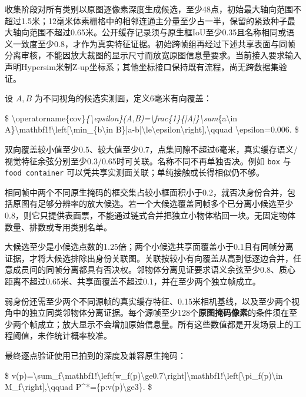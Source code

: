 \documentclass[UTF8,fontset=fandol]{ctexart}
\begin{document}
收集阶段对所有类别以原图逐像素深度生成候选，至少48点，初始最大轴向范围不超过1.5米；12毫米体素栅格中的相邻连通主分量至少占一半，保留的紧致种子最大轴向范围不超过0.65米。公开缓存记录须与原生框IoU至少0.35且名称相同或语义一致度至少0.8，才作为真实特征证据。初始跨帧组再经过下述共享表面与同帧分离审核，不能因放大裁图的显示尺寸而放宽原图信息量要求。当前接入要求输入声明Hypersim米制Z-up坐标系；其他坐标接口保持既有流程，尚无跨数据集验证。



设 $A,B$ 为不同视角的候选实测面，定义6毫米有向覆盖：



\$
\textbackslash{}operatorname\{cov\}\emph{\{\textbackslash{}epsilon\}(A,B)=\textbackslash{}frac\{1\}\{|A|\}\textbackslash{}sum}\{a\textbackslash{}in A\}\textbackslash{}mathbf1!\textbackslash{}left[\textbackslash{}min\_\{b\textbackslash{}in B\}|a-b|\textbackslash{}le\textbackslash{}epsilon\textbackslash{}right],\textbackslash{}qquad \textbackslash{}epsilon=0.006.
\$



双向覆盖较小值至少0.5、较大值至少0.7，点集间隙不超过6毫米，真实缓存语义/视觉特征余弦分别至少0.3/0.65时可关联。名称不同不再单独否决。例如 \texttt{box} 与 \texttt{food container} 可以凭共享实测面关联；单纯接触或长得相似仍不够。



相同帧中两个不同原生掩码的框交集占较小框面积小于0.2，就否决身份合并，包括原图有足够分辨率的放大候选。若一个大候选覆盖同帧多个已分离小候选至少0.8，则它只提供表面票，不能通过链式合并把独立小物体粘回一块。无固定物体数量、排数或专用类别名单。



大候选至少是小候选点数的1.25倍；两个小候选共享面覆盖小于0.1且有同帧分离证据，才将大候选排除出身份关联图。关联按较小有向覆盖从高到低逐边合并，任意成员间的同帧分离都具有否决权。邻物体分离见证要求语义余弦至少0.8、质心距离不超过0.65米、共享面覆盖不超过0.1，并在至少两个独立帧成立。



弱身份还需至少两个不同源帧的真实缓存特征、0.15米相机基线，以及至少两个视角中的独立同类邻物体分离证据。每个源帧至少128个\textbf{原图掩码像素}的条件须在至少两个帧成立；放大显示不会增加原始信息量。所有这些数值都是开发场景上的工程阈值，未作统计概率校准。



最终逐点验证使用已拍到的深度及兼容原生掩码：



\$
v(p)=\textbackslash{}sum\_f\textbackslash{}mathbf1!\textbackslash{}left[w\_f(p)\textbackslash{}ge0.7\textbackslash{}right]\textbackslash{}mathbf1!\textbackslash{}left[\textbackslash{}pi\_f(p)\textbackslash{}in M\_f\textbackslash{}right],\textbackslash{}qquad P\textasciicircum{}*=\{p:v(p)\textbackslash{}ge3\}.
\$
\end{document}
